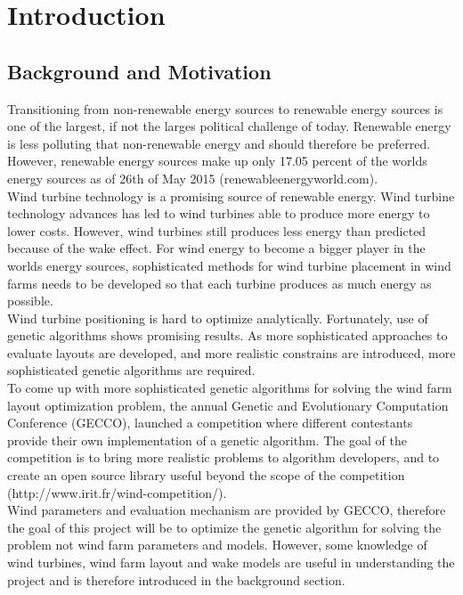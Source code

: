\documentclass[12pt]{report}
\begin{document}
\section{Introduction}


\subsection{Background and Motivation}
Transitioning from non-renewable energy sources to renewable energy sources is one of the largest, if not the larges political challenge of today. Renewable energy is less polluting that non-renewable energy and should therefore be preferred. However, renewable energy sources make up only 17.05 percent of the worlds energy sources as of 26th of May 2015 (renewableenergyworld.com). \\

\noindent Wind turbine technology is a promising source of renewable energy. Wind turbine technology advances has led to wind turbines able to produce more energy to lower costs. However, wind turbines still produces less energy than predicted because of the wake effect. For wind energy to become a bigger player in the worlds energy sources, sophisticated methods for wind turbine placement in wind farms needs to be developed so that each turbine produces as much energy as possible. \\

\noindent Wind turbine positioning is hard to optimize analytically. Fortunately, use of genetic algorithms shows promising results. As more sophisticated approaches to evaluate layouts are developed, and more realistic constrains are introduced, more sophisticated genetic algorithms are required. \\

\noindent To come up with more sophisticated genetic algorithms for solving the wind farm layout optimization problem, the annual Genetic and Evolutionary Computation Conference (GECCO), launched a competition where different contestants provide their own implementation of a genetic algorithm. The goal of the competition is to bring more realistic problems to algorithm developers, and to create an open source library useful beyond the scope of the competition (http://www.irit.fr/wind-competition/). \\

\noindent Wind parameters and evaluation mechanism are provided by GECCO, therefore the goal of this project will be to optimize the genetic algorithm for solving the problem not wind farm parameters and models. However, some knowledge of wind turbines, wind farm layout and wake models are useful in understanding the project and is therefore introduced in the background section. 
\end{document}
